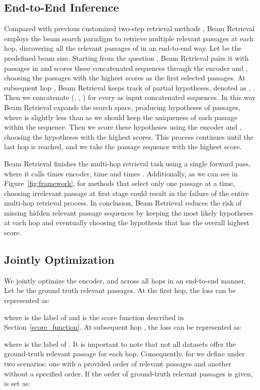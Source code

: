 \documentclass[10.5pt]{article}
\begin{document}
\subsection{End-to-End Inference}
Compared with previous customized two-step retrieval methods \cite{DBLP:journals/corr/abs-2107-11823, DBLP:journals/corr/abs-2205-11729, DBLP:journals/corr/abs-2212-09512}, Beam Retrieval employs the beam search paradigm to retrieve multiple relevant passages at each hop, discovering all the relevant passages of  in an end-to-end way. Let  be the predefined beam size. Starting from the question , Beam Retrieval pairs it with  passages in  and scores these  concatenated sequences through the encoder and , choosing the  passages with the highest scores as the first selected passages. At subsequent hop , Beam Retrieval keeps track of  partial hypotheses, denoted as , . Then we concatenate (, , ) for every  as input concatenated sequences. In this way Beam Retrieval expands the search space, producing  hypotheses of passages, where  is slightly less than  as we should keep the uniqueness of each passage within the sequence. Then we score these hypotheses using the encoder and , choosing the  hypotheses with the highest scores. This process continues until the last hop is reached, and we take the passage sequence with the highest score. 

Beam Retrieval finishes the multi-hop retrieval task using a single forward pass, where it calls  times encoder,  time  and  times . Additionally, as we can see in Figure~\ref{fig:framework}, for methods that select only one passage at a time, choosing irrelevant passage at first stage could result in the failure of the entire multi-hop retrieval process.
In conclusion, Beam Retrieval reduces the risk of missing hidden relevant passage sequences by keeping the most likely  hypotheses at each hop and eventually choosing the hypothesis that has the overall highest score.
\subsection{Jointly Optimization}
We jointly optimize the encoder,  and  across all hops in an end-to-end manner. Let  be the ground truth relevant passages. At the first hop, the loss can be represented as:


where  is the label of  and  is the score function described in Section~\ref{score_function}. 
At subsequent hop , the loss can be represented as:

where  is the label of . It is important to note that not all datasets offer the ground-truth relevant passage for each hop. Consequently, for  we define  under two scenarios: one with a provided order of relevant passages and another without a specified order. If the order of ground-truth relevant passages is given,  is set as: 
\end{document}
